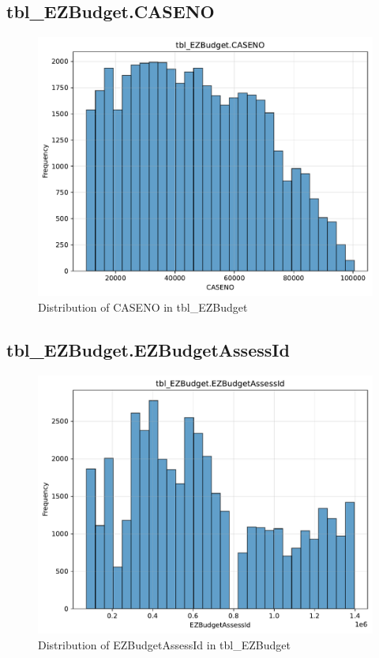 \subsection{tbl\_EZBudget.CASENO}

\begin{figure}[htbp]
\centering
\includegraphics[width=\textwidth]{figures/dbo_tbl_EZBudget_CASENO.pdf}
\caption{Distribution of CASENO in tbl\_EZBudget}
\end{figure}\newpage

\subsection{tbl\_EZBudget.EZBudgetAssessId}

\begin{figure}[htbp]
\centering
\includegraphics[width=\textwidth]{figures/dbo_tbl_EZBudget_EZBudgetAssessId.pdf}
\caption{Distribution of EZBudgetAssessId in tbl\_EZBudget}
\end{figure}\newpage


